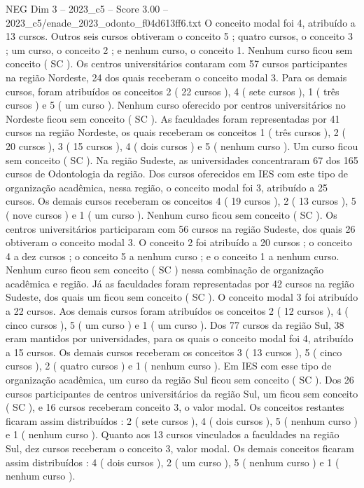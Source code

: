 \begin{textsample}{NEG Dim 3 – 2023\_c5 – Score 3.00 – 2023\_c5/enade\_2023\_odonto\_f04d613ff6.txt}
O conceito modal foi 4, atribuído a 13 cursos.
Outros seis cursos obtiveram o conceito 5 ; quatro cursos, o conceito 3 ; um curso, o conceito 2 ; e nenhum curso, o conceito 1.
Nenhum curso ficou sem conceito ( SC ).
Os centros universitários contaram com 57 cursos participantes na região Nordeste, 24 dos quais receberam o conceito modal 3.
Para os demais cursos, foram atribuídos os conceitos 2 ( 22 cursos ), 4 ( sete cursos ), 1 ( três cursos ) e 5 ( um curso ).
Nenhum curso oferecido por centros universitários no Nordeste ficou sem conceito ( SC ).
As faculdades foram representadas por 41 cursos na região Nordeste, os quais receberam os conceitos 1 ( três cursos ), 2 ( 20 cursos ), 3 ( 15 cursos ), 4 ( dois cursos ) e 5 ( nenhum curso ).
Um curso ficou sem conceito ( SC ).
Na região Sudeste, as universidades concentraram 67 dos 165 cursos de Odontologia da região.
Dos cursos oferecidos em IES com este tipo de organização acadêmica, nessa região, o conceito modal foi 3, atribuído a 25 cursos.
Os demais cursos receberam os conceitos 4 ( 19 cursos ), 2 ( 13 cursos ), 5 ( nove cursos ) e 1 ( um curso ).
Nenhum curso ficou sem conceito ( SC ).
Os centros universitários participaram com 56 cursos na região Sudeste, dos quais 26 obtiveram o conceito modal 3.
O conceito 2 foi atribuído a 20 cursos ; o conceito 4 a dez cursos ; o conceito 5 a nenhum curso ; e o conceito 1 a nenhum curso.
Nenhum curso ficou sem conceito ( SC ) nessa combinação de organização acadêmica e região.
Já as faculdades foram representadas por 42 cursos na região Sudeste, dos quais um ficou sem conceito ( SC ).
O conceito modal 3 foi atribuído a 22 cursos.
Aos demais cursos foram atribuídos os conceitos 2 ( 12 cursos ), 4 ( cinco cursos ), 5 ( um curso ) e 1 ( um curso ).
Dos 77 cursos da região Sul, 38 eram mantidos por universidades, para os quais o conceito modal foi 4, atribuído a 15 cursos.
Os demais cursos receberam os conceitos 3 ( 13 cursos ), 5 ( cinco cursos ), 2 ( quatro cursos ) e 1 ( nenhum curso ).
Em IES com esse tipo de organização acadêmica, um curso da região Sul ficou sem conceito ( SC ).
Dos 26 cursos participantes de centros universitários da região Sul, um ficou sem conceito ( SC ), e 16 cursos receberam conceito 3, o valor modal.
Os conceitos restantes ficaram assim distribuídos : 2 ( sete cursos ), 4 ( dois cursos ), 5 ( nenhum curso ) e 1 ( nenhum curso ).
Quanto aos 13 cursos vinculados a faculdades na região Sul, dez cursos receberam o conceito 3, valor modal.
Os demais conceitos ficaram assim distribuídos : 4 ( dois cursos ), 2 ( um curso ), 5 ( nenhum curso ) e 1 ( nenhum curso ).

\end{textsample}
